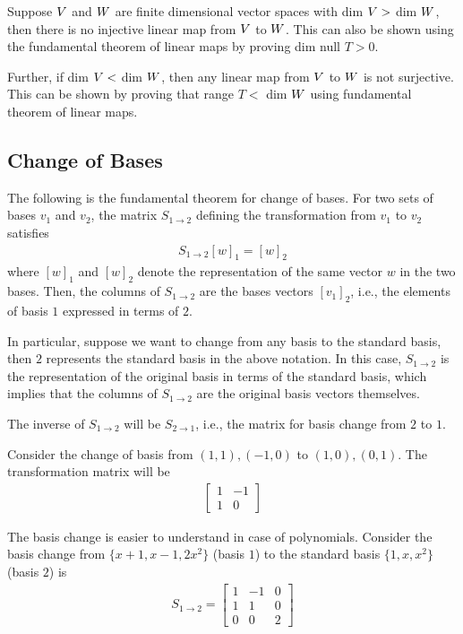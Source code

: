 \documentclass[../../linear_algebra.tex]{subfiles}
\begin{document}
Suppose $V$ and $W$ are finite dimensional vector spaces with dim $V >$ dim $W$, then there is no injective linear map from $V$ to $W$. This can also be shown using the fundamental theorem of linear maps by proving dim null $T > 0$.\newline

Further, if dim $V < $ dim $W$, then any linear map from $V$ to $W$ is not surjective. This can be shown by proving that range $T <$ dim $W$ using fundamental theorem of linear maps.

\subsection{Change of Bases}
The following is the fundamental theorem for change of bases. For two sets of bases $v_{1}$ and $v_{2}$, the matrix $S_{1 \to 2}$ defining the transformation from $v_{1}$ to $v_{2}$ satisfies
\begin{align*}
    S_{1 \to 2} [w]_{1} = [w]_{2}
\end{align*}
where $[w]_{1}$ and $[w]_{2}$ denote the representation of the same vector $w$ in the two bases. Then, the columns of $S_{1 \to 2}$ are the bases vectors $[v_{1}]_{2}$, i.e., the elements of basis $1$ expressed in terms of $2$.\newline

In particular, suppose we want to change from any basis to the standard basis, then $2$ represents the standard basis in the above notation. In this case, $S_{1 \to 2}$ is the representation of the original basis in terms of the standard basis, which implies that the columns of $S_{1 \to 2}$ are the original basis vectors themselves.\newline

The inverse of $S_{1 \to 2}$ will be $S_{2 \to 1}$, i.e., the matrix for basis change from $2$ to $1$.\newline

Consider the change of basis from $(1,1), (-1,0)$ to $(1,0), (0,1)$. The transformation matrix will be
\begin{align*}
    \begin{bmatrix}
        1 &-1\\
        1 &0
    \end{bmatrix}
\end{align*}

The basis change is easier to understand in case of polynomials. Consider the basis change from $\{x+1, x-1, 2x^{2}\}$ (basis $1$) to the standard basis $\{ 1, x, x^{2} \}$ (basis $2$) is
\begin{align*}
    S_{1 \to 2} = \begin{bmatrix}
        1 &-1 &0\\
        1 &1 &0\\
        0 &0 &2
    \end{bmatrix}
\end{align*}
\end{document}
